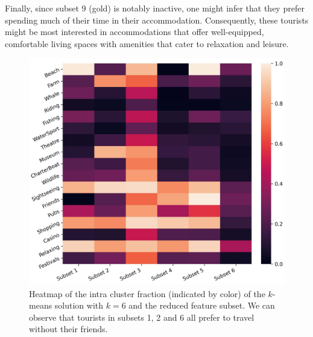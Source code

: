 \documentclass[article]{ajs}
\begin{document}
Finally, since subset 9 (gold) is notably inactive, one might infer that they prefer spending much of their time in their accommodation. Consequently, these tourists might be most interested in accommodations that offer well-equipped, comfortable living spaces with amenities that cater to relaxation and leisure.


\begin{figure}[h!]
    \centering
    \includegraphics[width=1\textwidth]{aus_heatmap.pdf}
    \caption{Heatmap of the intra cluster fraction (indicated by color) of the $k$-means solution with \( k = 6 \) and the reduced feature subset. We can observe that tourists in subsets 1, 2 and 6 all prefer to travel without their friends.}
    \label{fig:aus_heatmapg}
\end{figure}
\end{document}
